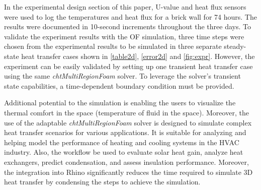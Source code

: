 In the experimental design section of this paper, U-value and heat flux sensors were used to log the temperatures and heat flux for a brick wall for 74 hours. The results were documented in 10-second increments throughout the three days. To validate the experiment results with the \gls{OF} simulation, three time steps were chosen from the experimental results to be simulated in three separate steady-state heat transfer cases shown in \ref{table2d}, \ref{error2d} and \ref{fig:expr}. However, the experiment can be easily validated by setting up one transient heat transfer case using the same \textit{chtMultiRegionFoam} solver. To leverage the solver's transient state capabilities, a time-dependent boundary condition must be provided. 



Additional potential to the simulation is enabling the users to visualize the thermal comfort in the space (temperature of fluid in the space). Moreover, the use of the adaptable \textit{chtMultiRegionFoam} solver is designed to simulate complex heat transfer scenarios for various applications. It is suitable for analyzing and helping model the performance of heating and cooling systems in the HVAC  industry. Also, the workflow be used to evaluate solar heat gain, analyze heat exchangers, predict condensation, and assess insulation performance. Moreover, the integration into
Rhino significantly reduces the time required to simulate 3D heat transfer by condensing the steps to achieve the simulation.



